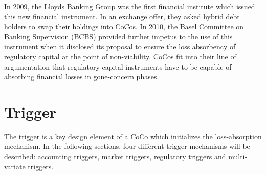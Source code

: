 In 2009, the Lloyds Banking Group was the first financial institute which issued this new financial instrument. In an exchange offer, they asked hybrid debt holders to swap their holdings into CoCos. \citep{de2011pricing} In 2010, the Basel Committee on Banking Supervision (BCBS) provided further impetus to the use of this instrument when it disclosed its proposal to ensure the loss absorbency of regulatory capital at the point of non-viability. CoCos fit into their line of  argumentation that regulatory capital instruments have to be capable of absorbing financial losses in gone-concern phases. \citep{basel2010proposal}



\section{Trigger} \label{triggermechanism}

The trigger is a key design element of a CoCo which initializes the loss-absorption mechanism. In the following sections, four different trigger mechanisms will be described: accounting triggers, market triggers, regulatory triggers and multi-variate triggers. %

